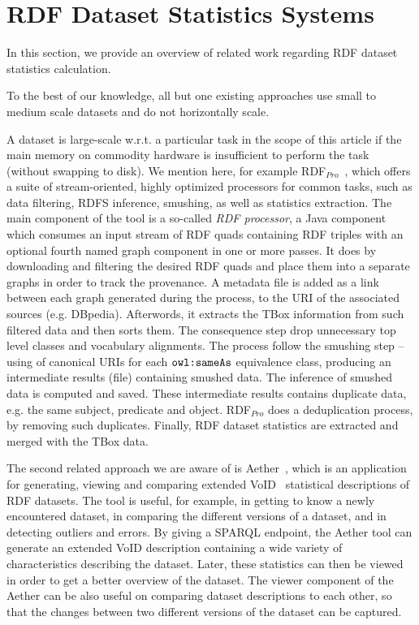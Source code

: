 \section{RDF Dataset Statistics Systems}
In this section, we provide an overview of related work regarding \gls{RDF} dataset statistics calculation.

To the best of our knowledge, all but one existing approaches use small to medium scale datasets and do not horizontally scale.

A dataset is large-scale w.r.t. a particular task in the scope of this article if the main memory on commodity hardware is insufficient to perform the task (without swapping to disk). 
We mention here, for example RDF$_{Pro}$~\cite{SAC-2015-CorcoglionitiRM}, which offers a suite of stream-oriented, highly optimized processors for common tasks, such as data filtering, RDFS inference, smushing, as well as statistics extraction.
The main component of the tool is a so-called \textit{RDF processor}, a Java component which consumes an input stream of RDF quads containing \gls{RDF} triples with an optional fourth named graph component in one or more passes.
It does by downloading and filtering the desired RDF quads and place them into a separate graphs in order to track the provenance.
A metadata file is added as a link between each graph generated during the process, to the \gls{URI} of the associated sources (e.g. DBpedia).
Afterwords, it extracts the TBox information from such filtered data and then sorts them. 
The consequence step drop unnecessary top level classes and vocabulary alignments.
The process follow the smushing step -- using of canonical \gls{URI}s for each $\verb|owl:sameAs|$ equivalence class, producing an intermediate results (file) containing smushed data.
The inference of smushed data is computed and saved.
These intermediate results contains duplicate data, e.g. the same subject, predicate and object.
RDF$_{Pro}$ does a deduplication process, by removing such duplicates.
Finally, \gls{RDF} dataset statistics are extracted and merged with the TBox data.

The second related approach we are aware of is Aether~\cite{makela2014aether}, which is an application for generating, viewing and comparing extended VoID~\cite{Zhao:11:VoID} statistical descriptions of \gls{RDF} datasets.
The tool is useful, for example, in getting to know a newly encountered dataset, in comparing the different versions of a dataset, and in detecting outliers and errors.
By giving a \gls{SPARQL} endpoint, the Aether tool can generate an extended VoID description containing a wide variety of characteristics describing the dataset.
Later, these statistics can then be viewed in order to get a better overview of the dataset.
The viewer component of the Aether can be also useful on comparing dataset descriptions to each other, so that the changes between two different versions of the dataset can be captured.

